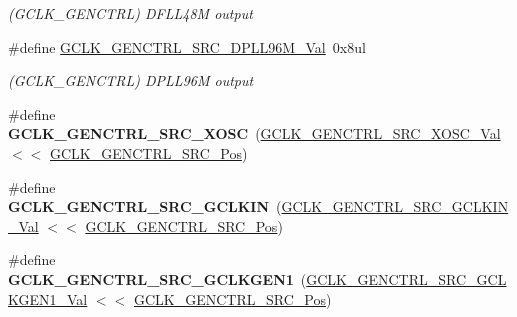 \begin{DoxyCompactItemize}
\begin{DoxyCompactList}\small\item\em (G\+C\+L\+K\+\_\+\+G\+E\+N\+C\+T\+R\+L) D\+F\+L\+L48\+M output \end{DoxyCompactList}\item 
\hypertarget{group___s_a_m_l21___g_c_l_k_gadf9c51d674d25e89631e118291f82657}{}\#define \hyperlink{group___s_a_m_l21___g_c_l_k_gadf9c51d674d25e89631e118291f82657}{G\+C\+L\+K\+\_\+\+G\+E\+N\+C\+T\+R\+L\+\_\+\+S\+R\+C\+\_\+\+D\+P\+L\+L96\+M\+\_\+\+Val}~0x8ul\label{group___s_a_m_l21___g_c_l_k_gadf9c51d674d25e89631e118291f82657}

\begin{DoxyCompactList}\small\item\em (G\+C\+L\+K\+\_\+\+G\+E\+N\+C\+T\+R\+L) D\+P\+L\+L96\+M output \end{DoxyCompactList}\item 
\hypertarget{group___s_a_m_l21___g_c_l_k_gad224796335cb16ec3d64a68efeb5c9b7}{}\#define {\bfseries G\+C\+L\+K\+\_\+\+G\+E\+N\+C\+T\+R\+L\+\_\+\+S\+R\+C\+\_\+\+X\+O\+S\+C}~(\hyperlink{group___s_a_m_l21___g_c_l_k_gad48c4f5ba6b5112eef4d978cf2ae73bc}{G\+C\+L\+K\+\_\+\+G\+E\+N\+C\+T\+R\+L\+\_\+\+S\+R\+C\+\_\+\+X\+O\+S\+C\+\_\+\+Val}     $<$$<$ \hyperlink{group___s_a_m_l21___g_c_l_k_ga3ca6fb0d36a0f1194282d2517b22965f}{G\+C\+L\+K\+\_\+\+G\+E\+N\+C\+T\+R\+L\+\_\+\+S\+R\+C\+\_\+\+Pos})\label{group___s_a_m_l21___g_c_l_k_gad224796335cb16ec3d64a68efeb5c9b7}

\item 
\hypertarget{group___s_a_m_l21___g_c_l_k_gae54fac01315c959abdf2f2396a9ff0bf}{}\#define {\bfseries G\+C\+L\+K\+\_\+\+G\+E\+N\+C\+T\+R\+L\+\_\+\+S\+R\+C\+\_\+\+G\+C\+L\+K\+I\+N}~(\hyperlink{group___s_a_m_l21___g_c_l_k_ga4c279c59a26c988991b63eb2682e8acc}{G\+C\+L\+K\+\_\+\+G\+E\+N\+C\+T\+R\+L\+\_\+\+S\+R\+C\+\_\+\+G\+C\+L\+K\+I\+N\+\_\+\+Val}   $<$$<$ \hyperlink{group___s_a_m_l21___g_c_l_k_ga3ca6fb0d36a0f1194282d2517b22965f}{G\+C\+L\+K\+\_\+\+G\+E\+N\+C\+T\+R\+L\+\_\+\+S\+R\+C\+\_\+\+Pos})\label{group___s_a_m_l21___g_c_l_k_gae54fac01315c959abdf2f2396a9ff0bf}

\item 
\hypertarget{group___s_a_m_l21___g_c_l_k_gad3c6aba8780393019af9aa777041eecc}{}\#define {\bfseries G\+C\+L\+K\+\_\+\+G\+E\+N\+C\+T\+R\+L\+\_\+\+S\+R\+C\+\_\+\+G\+C\+L\+K\+G\+E\+N1}~(\hyperlink{group___s_a_m_l21___g_c_l_k_ga2774be4de7707cea940a2b7ec37f30e3}{G\+C\+L\+K\+\_\+\+G\+E\+N\+C\+T\+R\+L\+\_\+\+S\+R\+C\+\_\+\+G\+C\+L\+K\+G\+E\+N1\+\_\+\+Val} $<$$<$ \hyperlink{group___s_a_m_l21___g_c_l_k_ga3ca6fb0d36a0f1194282d2517b22965f}{G\+C\+L\+K\+\_\+\+G\+E\+N\+C\+T\+R\+L\+\_\+\+S\+R\+C\+\_\+\+Pos})\label{group___s_a_m_l21___g_c_l_k_gad3c6aba8780393019af9aa777041eecc}


\end{DoxyCompactItemize}

